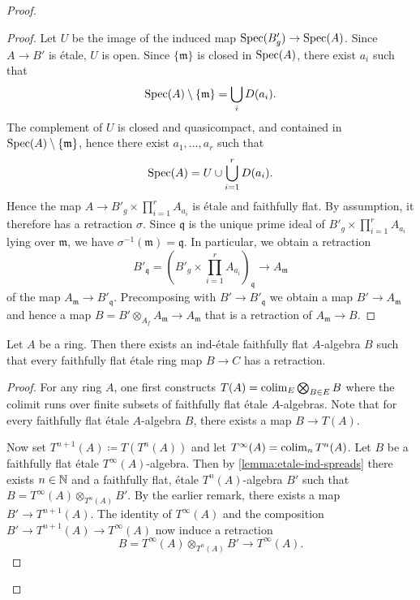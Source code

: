 \begin{proof}
\begin{proof}
    Let $U$ be the image of the induced map $\mathrm{Spec}(B'_g) \to \mathrm{Spec}(A)$. Since $A \to B'$ is étale, $U$ is open.
    Since $\{\mathfrak{m}\}$ is closed in $\mathrm{Spec}(A)$, there exist $a_i$ such that
    \[
        \mathrm{Spec}(A) \setminus \{\mathfrak{m}\} = \bigcup_{i} D(a_i)
    .\] The complement of $U$ is closed and quasicompact, and contained in $\mathrm{Spec}(A) \setminus \{\mathfrak{m}\}$, hence
    there exist $a_1, \ldots, a_r$ such that
    \[
        \mathrm{Spec}(A) = U \cup \bigcup_{i=1}^r D(a_i)
    .\] Hence the map $A \to B'_g \times \prod_{i=1}^{r} A_{a_i}$ is étale and faithfully flat. By assumption,
    it therefore has a retraction $\sigma$. Since $\mathfrak{q}$ is the unique prime ideal of $B'_g \times \prod_{i=1}^{r} A_{a_i}$
    lying over $\mathfrak{m}$, we have $\sigma^{-1}(\mathfrak{m}) = \mathfrak{q}$. In particular,
    we obtain a retraction
    \[
        B'_{\mathfrak{q}} = \left(B'_g \times \prod_{i=1}^{r} A_{a_i}\right)_{\mathfrak{q}} \to A_{\mathfrak{m}}
    \] of the map $A_{\mathfrak{m}} \to B'_{\mathfrak{q}}$. Precomposing with $B' \to B'_{\mathfrak{q}}$ we obtain
    a map $B' \to A_{\mathfrak{m}}$ and hence a map
    $B = B' \otimes_{A_f} A_{\mathfrak{m}} \to A_{\mathfrak{m}}$ that is a retraction of $A_{\mathfrak{m}} \to B$.
\end{proof}

\begin{proposition}
    Let $A$ be a ring. Then there exists an ind-étale faithfully flat $A$-algebra $B$ such that
    every faithfully flat étale ring map $B \to C$ has a retraction.
    \label{prop:exists-ind-etale-retraction-etale}
\end{proposition}

\begin{proof}
    For any ring $A$, one first constructs $T(A) = \operatorname{colim}_{E} \bigotimes_{B \in E} B$ where
    the colimit runs over finite subsets of faithfully flat étale $A$-algebras. Note that for every faithfully flat étale
    $A$-algebra $B$, there exists a map $B \to T(A)$.

    Now set $T^{n+1}(A) \coloneqq T(T^n(A))$
    and let $T^{\infty}(A) = \operatorname{colim}_n T^n(A)$. Let $B$ be a faithfully flat étale $T^{\infty}(A)$-algebra. Then
    by \ref{lemma:etale-ind-spreads}
    there exists $n \in \mathbb{N}$ and a faithfully flat, étale $T^n(A)$-algebra $B'$ such that
    $B = T^{\infty}(A) \otimes_{T^n(A)} B'$. By the earlier remark, there exists a map
    $B' \to T^{n+1}(A)$. The identity of $T^{\infty}(A)$ and the composition
    $B' \to T^{n+1}(A) \to T^{\infty}(A)$ now induce a retraction
    \[
    B = T^{\infty}(A) \otimes_{T^n(A)} B' \to T^{\infty}(A)
    .\]
\end{proof}


\end{proof}
